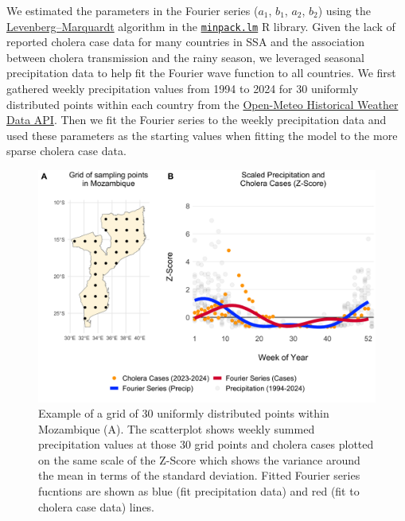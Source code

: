 \documentclass[
]{book}
\begin{document}
We estimated the parameters in the Fourier series (\(a_1\), \(b_1\), \(a_2\), \(b_2\)) using the \href{https://en.wikipedia.org/wiki/Levenberg\%E2\%80\%93Marquardt_algorithm}{Levenberg--Marquardt} algorithm in the \href{https://rdrr.io/cran/minpack.lm/}{\texttt{minpack.lm}} R library. Given the lack of reported cholera case data for many countries in SSA and the association between cholera transmission and the rainy season, we leveraged seasonal precipitation data to help fit the Fourier wave function to all countries. We first gathered weekly precipitation values from 1994 to 2024 for 30 uniformly distributed points within each country from the \href{https://open-meteo.com/en/docs/historical-weather-api}{Open-Meteo Historical Weather Data API}. Then we fit the Fourier series to the weekly precipitation data and used these parameters as the starting values when fitting the model to the more sparse cholera case data.

\begin{figure}

{\centering \includegraphics[width=1\linewidth]{figures/seasonal_transmission_example_MOZ} 

}

\caption{Example of a grid of 30 uniformly distributed points within Mozambique (A). The scatterplot shows weekly summed precipitation values at those 30 grid points and cholera cases plotted on the same scale of the Z-Score which shows the variance around the mean in terms of the standard deviation. Fitted Fourier series fucntions are shown as blue (fit precipitation data) and red (fit to cholera case data) lines.}\label{fig:seasonal-example}
\end{figure}
\end{document}
